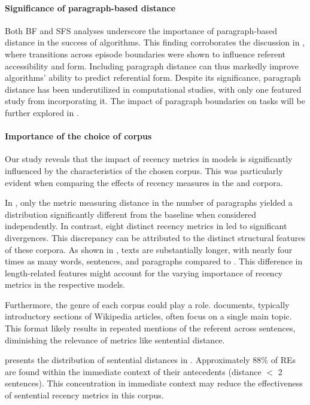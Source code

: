 \paragraph*{Significance of paragraph-based distance}
Both BF and SFS analyses underscore the importance of paragraph-based distance in the success of algorithms. This finding corroborates the discussion in , where transitions across episode boundaries were shown to influence referent accessibility and form. Including paragraph distance can thus markedly improve algorithms' ability to predict referential form. Despite its significance, paragraph distance has been underutilized in computational studies, with only one featured study from  incorporating it. The impact of paragraph boundaries on \context tasks will be further explored in .

\largerpage
\paragraph*{Importance of the choice of corpus} 

Our study reveals that the impact of recency metrics in \context models is significantly influenced by the characteristics of the chosen corpus. This was particularly evident when comparing the effects of recency measures in the \wsj and \msrcor corpora.

In \msrcor, only the metric measuring distance in the number of paragraphs yielded a distribution significantly different from the baseline when considered independently. In contrast, eight distinct recency metrics in \wsj led to significant divergences. This discrepancy can be attributed to the distinct structural features of these corpora. As shown in , \wsj texts are substantially longer, with nearly four times as many words, sentences, and paragraphs compared to \msrcor. This difference in length-related features might account for the varying importance of recency metrics in the respective models.

Furthermore, the genre of each corpus could play a role. \msrcor documents, typically introductory sections of Wikipedia articles, often focus on a single main topic. This format likely results in repeated mentions of the referent across sentences, diminishing the relevance of metrics like sentential distance.

 presents the distribution of sentential distances in \msrcor. Approximately 88\% of REs are found within the immediate context of their antecedents (distance $<$ 2 sentences). This concentration in immediate context may reduce the effectiveness of sentential recency metrics in this corpus.

